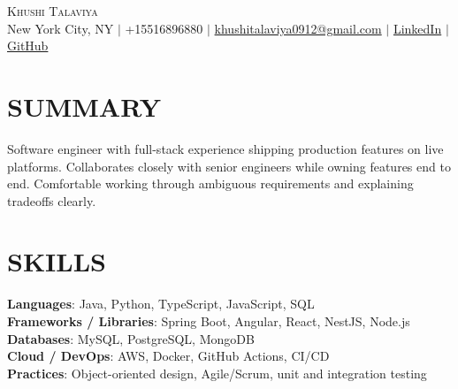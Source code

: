 \documentclass[letterpaper,11pt]{article}
\begin{document}
\begin{center}
    {\Huge \scshape Khushi Talaviya} \\ \vspace{2pt}
    \vspace{4pt}
    \small
    New York City, NY $|$
    \small
    +15516896880 $|$
    \href{mailto:khushitalaviya0912@gmail.com}{khushitalaviya0912@gmail.com} $|$
    \href{https://www.linkedin.com/in/khushitalaviya/}{LinkedIn} $|$
    \href{https://github.com/talaviyakhushi}{GitHub}
\end{center}

\section{SUMMARY}
\vspace{5pt}
\small{Software engineer with full-stack experience shipping production features on live platforms. Collaborates closely with senior engineers while owning features end to end. Comfortable working through ambiguous requirements and explaining tradeoffs clearly.}

\vspace{2pt}
\section{SKILLS}
\vspace{5pt}
\begin{itemize}[leftmargin=0in, label={}]
\small{\item{
\textbf{Languages}{: Java, Python, TypeScript, JavaScript, SQL} \\
\textbf{Frameworks / Libraries}{: Spring Boot, Angular, React, NestJS, Node.js} \\
\textbf{Databases}{: MySQL, PostgreSQL, MongoDB} \\
\textbf{Cloud / DevOps}{: AWS, Docker, GitHub Actions, CI/CD} \\
\textbf{Practices}{: Object-oriented design, Agile/Scrum, unit and integration testing}
}}
\end{itemize}
\vspace{-10pt}

\end{document}
